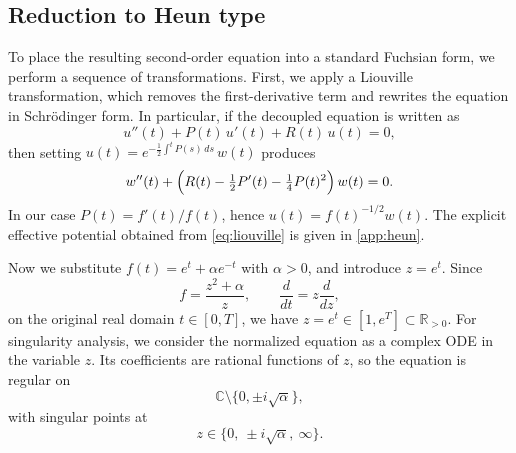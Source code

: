 \documentclass[11pt]{article}
\theoremstyle{definition}
\numberwithin{equation}{section}
\begin{document}
\subsection{Reduction to Heun type}\label{subsec:redtoheun}
To place the resulting second-order equation into a standard Fuchsian form, we perform a sequence of transformations. First, we apply a Liouville transformation, which removes the first-derivative term and rewrites the equation in Schr\"odinger form.
 In particular, if the decoupled equation is written as
\begin{equation}\label{eq:decoupled-general}
u''(t)+P(t)\,u'(t)+R(t)\,u(t)=0,
\end{equation}
then setting \(u(t)=e^{-\frac12\int^t P(s)\,ds}\,w(t)\) produces
\begin{equation}\label{eq:liouville}
w''(t)+\Bigl(R(t)-\tfrac12 P'(t)-\tfrac14 P(t)^2\Bigr)\,w(t)=0.
\end{equation}
In our case \(P(t)=f'(t)/f(t)\), hence \(u(t)=f(t)^{-1/2}w(t)\). The explicit effective potential obtained from \eqref{eq:liouville} is given in \autoref{app:heun}.


Now we substitute $f(t)=e^t+\alpha e^{-t}$ with $\alpha>0$, and introduce $z=e^t$. Since
\begin{equation}\label{eq:zchange}
f=\frac{z^2+\alpha}{z},\qquad \frac{d}{dt}=z\frac{d}{dz},
\end{equation}
on the original real domain $t\in[0,T]$, we have
$z=e^t\in[1,e^T]\subset\mathbb R_{>0}$. For singularity analysis, we consider the normalized equation as a complex ODE in the variable $z$. Its coefficients are rational functions of $z$, so the equation is regular on
\begin{equation}
\mathbb C\setminus\{0,\pm i\sqrt{\alpha}\},
\end{equation}
with singular points at
\begin{equation}\label{eq:zsing}
z\in\{0,\ \pm i\sqrt{\alpha},\ \infty\}.
\end{equation}
\end{document}
